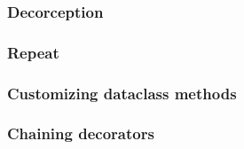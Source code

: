 \documentclass[9pt]{beamer}
\begin{document}
\begin{frame}
  \frametitle{Decorception}
  
\end{frame}


\begin{frame}
  \frametitle{Repeat}
  
\end{frame}


\begin{frame}
  \frametitle{Customizing dataclass methods}
  
\end{frame}


\begin{frame}
  \frametitle{Chaining decorators}
  
\end{frame} 
\end{document}
